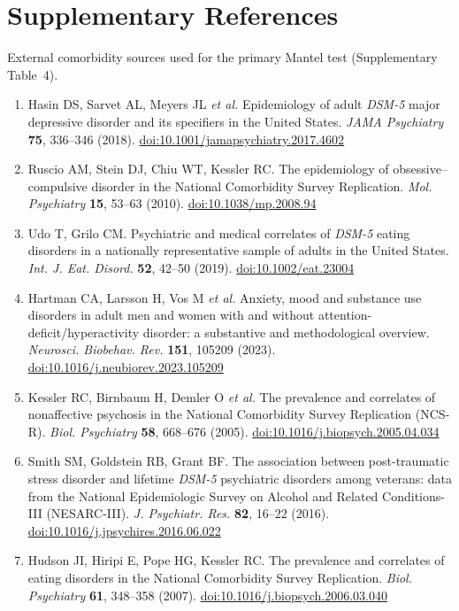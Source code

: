 \documentclass[11pt]{article}
\begin{document}
\section*{Supplementary References}
\noindent External comorbidity sources used for the primary Mantel test (Supplementary Table~4).
\begin{enumerate}
\item Hasin DS, Sarvet AL, Meyers JL \emph{et al.} Epidemiology of adult \emph{DSM-5} major depressive disorder and its specifiers in the United States. \emph{JAMA Psychiatry} \textbf{75}, 336--346 (2018). \href{https://doi.org/10.1001/jamapsychiatry.2017.4602}{doi:10.1001/jamapsychiatry.2017.4602}
\item Ruscio AM, Stein DJ, Chiu WT, Kessler RC. The epidemiology of obsessive--compulsive disorder in the National Comorbidity Survey Replication. \emph{Mol. Psychiatry} \textbf{15}, 53--63 (2010). \href{https://doi.org/10.1038/mp.2008.94}{doi:10.1038/mp.2008.94}
\item Udo T, Grilo CM. Psychiatric and medical correlates of \emph{DSM-5} eating disorders in a nationally representative sample of adults in the United States. \emph{Int. J. Eat. Disord.} \textbf{52}, 42--50 (2019). \href{https://doi.org/10.1002/eat.23004}{doi:10.1002/eat.23004}
\item Hartman CA, Larsson H, Vos M \emph{et al.} Anxiety, mood and substance use disorders in adult men and women with and without attention-deficit/hyperactivity disorder: a substantive and methodological overview. \emph{Neurosci. Biobehav. Rev.} \textbf{151}, 105209 (2023). \href{https://doi.org/10.1016/j.neubiorev.2023.105209}{doi:10.1016/j.neubiorev.2023.105209}
\item Kessler RC, Birnbaum H, Demler O \emph{et al.} The prevalence and correlates of nonaffective psychosis in the National Comorbidity Survey Replication (NCS-R). \emph{Biol. Psychiatry} \textbf{58}, 668--676 (2005). \href{https://doi.org/10.1016/j.biopsych.2005.04.034}{doi:10.1016/j.biopsych.2005.04.034}
\item Smith SM, Goldstein RB, Grant BF. The association between post-traumatic stress disorder and lifetime \emph{DSM-5} psychiatric disorders among veterans: data from the National Epidemiologic Survey on Alcohol and Related Conditions-III (NESARC-III). \emph{J. Psychiatr. Res.} \textbf{82}, 16--22 (2016). \href{https://doi.org/10.1016/j.jpsychires.2016.06.022}{doi:10.1016/j.jpsychires.2016.06.022}
\item Hudson JI, Hiripi E, Pope HG, Kessler RC. The prevalence and correlates of eating disorders in the National Comorbidity Survey Replication. \emph{Biol. Psychiatry} \textbf{61}, 348--358 (2007). \href{https://doi.org/10.1016/j.biopsych.2006.03.040}{doi:10.1016/j.biopsych.2006.03.040}
\end{enumerate}
\end{document}
